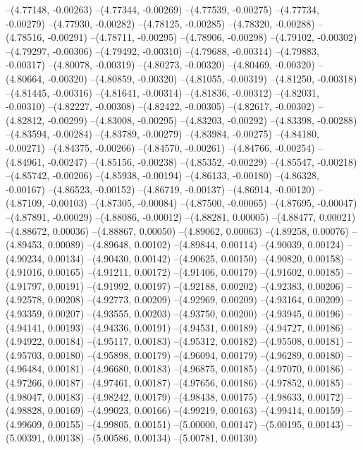 --(4.77148, -0.00263)
--(4.77344, -0.00269)
--(4.77539, -0.00275)
--(4.77734, -0.00279)
--(4.77930, -0.00282)
--(4.78125, -0.00285)
--(4.78320, -0.00288)
--(4.78516, -0.00291)
--(4.78711, -0.00295)
--(4.78906, -0.00298)
--(4.79102, -0.00302)
--(4.79297, -0.00306)
--(4.79492, -0.00310)
--(4.79688, -0.00314)
--(4.79883, -0.00317)
--(4.80078, -0.00319)
--(4.80273, -0.00320)
--(4.80469, -0.00320)
--(4.80664, -0.00320)
--(4.80859, -0.00320)
--(4.81055, -0.00319)
--(4.81250, -0.00318)
--(4.81445, -0.00316)
--(4.81641, -0.00314)
--(4.81836, -0.00312)
--(4.82031, -0.00310)
--(4.82227, -0.00308)
--(4.82422, -0.00305)
--(4.82617, -0.00302)
--(4.82812, -0.00299)
--(4.83008, -0.00295)
--(4.83203, -0.00292)
--(4.83398, -0.00288)
--(4.83594, -0.00284)
--(4.83789, -0.00279)
--(4.83984, -0.00275)
--(4.84180, -0.00271)
--(4.84375, -0.00266)
--(4.84570, -0.00261)
--(4.84766, -0.00254)
--(4.84961, -0.00247)
--(4.85156, -0.00238)
--(4.85352, -0.00229)
--(4.85547, -0.00218)
--(4.85742, -0.00206)
--(4.85938, -0.00194)
--(4.86133, -0.00180)
--(4.86328, -0.00167)
--(4.86523, -0.00152)
--(4.86719, -0.00137)
--(4.86914, -0.00120)
--(4.87109, -0.00103)
--(4.87305, -0.00084)
--(4.87500, -0.00065)
--(4.87695, -0.00047)
--(4.87891, -0.00029)
--(4.88086, -0.00012)
--(4.88281, 0.00005)
--(4.88477, 0.00021)
--(4.88672, 0.00036)
--(4.88867, 0.00050)
--(4.89062, 0.00063)
--(4.89258, 0.00076)
--(4.89453, 0.00089)
--(4.89648, 0.00102)
--(4.89844, 0.00114)
--(4.90039, 0.00124)
--(4.90234, 0.00134)
--(4.90430, 0.00142)
--(4.90625, 0.00150)
--(4.90820, 0.00158)
--(4.91016, 0.00165)
--(4.91211, 0.00172)
--(4.91406, 0.00179)
--(4.91602, 0.00185)
--(4.91797, 0.00191)
--(4.91992, 0.00197)
--(4.92188, 0.00202)
--(4.92383, 0.00206)
--(4.92578, 0.00208)
--(4.92773, 0.00209)
--(4.92969, 0.00209)
--(4.93164, 0.00209)
--(4.93359, 0.00207)
--(4.93555, 0.00203)
--(4.93750, 0.00200)
--(4.93945, 0.00196)
--(4.94141, 0.00193)
--(4.94336, 0.00191)
--(4.94531, 0.00189)
--(4.94727, 0.00186)
--(4.94922, 0.00184)
--(4.95117, 0.00183)
--(4.95312, 0.00182)
--(4.95508, 0.00181)
--(4.95703, 0.00180)
--(4.95898, 0.00179)
--(4.96094, 0.00179)
--(4.96289, 0.00180)
--(4.96484, 0.00181)
--(4.96680, 0.00183)
--(4.96875, 0.00185)
--(4.97070, 0.00186)
--(4.97266, 0.00187)
--(4.97461, 0.00187)
--(4.97656, 0.00186)
--(4.97852, 0.00185)
--(4.98047, 0.00183)
--(4.98242, 0.00179)
--(4.98438, 0.00175)
--(4.98633, 0.00172)
--(4.98828, 0.00169)
--(4.99023, 0.00166)
--(4.99219, 0.00163)
--(4.99414, 0.00159)
--(4.99609, 0.00155)
--(4.99805, 0.00151)
--(5.00000, 0.00147)
--(5.00195, 0.00143)
--(5.00391, 0.00138)
--(5.00586, 0.00134)
--(5.00781, 0.00130)

